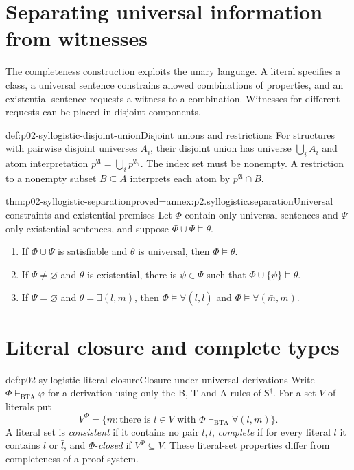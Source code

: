 \section{Separating universal information from witnesses}

The completeness construction exploits the unary language. A literal
specifies a class, a universal sentence constrains allowed combinations of
properties, and an existential sentence requests a witness to a combination.
Witnesses for different requests can be placed in disjoint components.

\begin{hbdefinition}{def:p02-syllogistic-disjoint-union}{Disjoint unions and restrictions}
For structures with pairwise disjoint universes \(A_i\), their disjoint union
has universe \(\bigcup_i A_i\) and atom interpretation
\(p^{\mathfrak A}=\bigcup_i p^{\mathfrak A_i}\). The index set must be
nonempty. A restriction to a nonempty subset \(B\subseteq A\) interprets
each atom by \(p^{\mathfrak A}\cap B\).
\end{hbdefinition}

\begin{hblemma}{thm:p02-syllogistic-separation}{proved=annex:p2.syllogistic.separation}{Universal constraints and existential premises}
Let \(\Phi\) contain only universal sentences and \(\Psi\) only existential
sentences, and suppose \(\Phi\cup\Psi\models\theta\).
\begin{enumerate}
\item If \(\Phi\cup\Psi\) is satisfiable and \(\theta\) is universal,
then \(\Phi\models\theta\).
\item If \(\Psi\ne\varnothing\) and \(\theta\) is existential, there is
\(\psi\in\Psi\) such that \(\Phi\cup\{\psi\}\models\theta\).
\item If \(\Psi=\varnothing\) and \(\theta=\exists(l,m)\), then
\(\Phi\models\forall(\bar l,l)\) and
\(\Phi\models\forall(\bar m,m)\).
\end{enumerate}
\end{hblemma}

\section{Literal closure and complete types}

\begin{hbdefinition}{def:p02-syllogistic-literal-closure}{Closure under universal derivations}
Write \(\Phi\vdash_{\mathrm{BTA}}\varphi\) for a derivation using only
the B, T and A rules of \(\mathsf S^\dagger\). For a set \(V\) of literals put
\[
 V^\Phi=\{m:\text{there is }l\in V
       \text{ with }\Phi\vdash_{\mathrm{BTA}}\forall(l,m)\}.
\]
A literal set is \emph{consistent} if it contains no pair \(l,\bar l\),
\emph{complete} if for every literal \(l\) it contains \(l\) or \(\bar l\),
and \(\Phi\)-\emph{closed} if \(V^\Phi\subseteq V\).
These literal-set properties differ from completeness of a proof system.
\end{hbdefinition}

